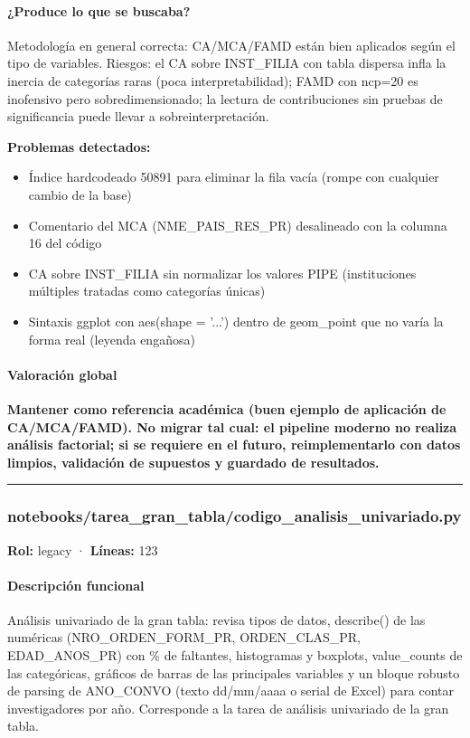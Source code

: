 \paragraph{¿Produce lo que se buscaba?}
Metodología en general correcta: CA/MCA/FAMD están bien aplicados según el tipo de variables. Riesgos: el CA sobre INST\_FILIA con tabla dispersa infla la inercia de categorías raras (poca interpretabilidad); FAMD con ncp=20 es inofensivo pero sobredimensionado; la lectura de contribuciones sin pruebas de significancia puede llevar a sobreinterpretación.

\begin{tcolorbox}[riesgo]
\textbf{Problemas detectados:}
\begin{itemize}
  \item Índice hardcodeado 50891 para eliminar la fila vacía (rompe con cualquier cambio de la base)
  \item Comentario del MCA (NME\_PAIS\_RES\_PR) desalineado con la columna 16 del código
  \item CA sobre INST\_FILIA sin normalizar los valores PIPE (instituciones múltiples tratadas como categorías únicas)
  \item Sintaxis ggplot con aes(shape = '...') dentro de geom\_point que no varía la forma real (leyenda engañosa)
\end{itemize}
\end{tcolorbox}

\paragraph{Valoración global}
\textbf{Mantener como referencia académica (buen ejemplo de aplicación de CA/MCA/FAMD). No migrar tal cual: el pipeline moderno no realiza análisis factorial; si se requiere en el futuro, reimplementarlo con datos limpios, validación de supuestos y guardado de resultados.}

\medskip
\hrule

\subsubsection{notebooks/tarea\_gran\_tabla/codigo\_analisis\_univariado.py}
\textbf{Rol:} legacy · \textbf{Líneas:} 123

\paragraph{Descripción funcional}
Análisis univariado de la gran tabla: revisa tipos de datos, describe() de las numéricas (NRO\_ORDEN\_FORM\_PR, ORDEN\_CLAS\_PR, EDAD\_ANOS\_PR) con \% de faltantes, histogramas y boxplots, value\_counts de las categóricas, gráficos de barras de las principales variables y un bloque robusto de parsing de ANO\_CONVO (texto dd/mm/aaaa o serial de Excel) para contar investigadores por año. Corresponde a la tarea de análisis univariado de la gran tabla.

